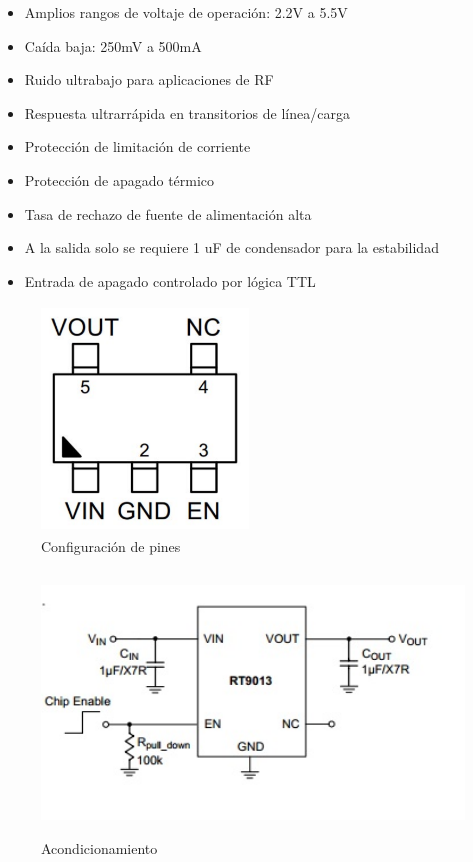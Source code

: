 \begin{itemize}
    \item Amplios rangos de voltaje de operación: 2.2V a 5.5V
    \item Caída baja: 250mV a 500mA
    \item Ruido ultrabajo para aplicaciones de RF
    \item Respuesta ultrarrápida en transitorios de línea/carga
    \item Protección de limitación de corriente
    \item Protección de apagado térmico
    \item Tasa de rechazo de fuente de alimentación alta
    \item A la salida solo se requiere 1 uF de condensador para la estabilidad
    \item Entrada de apagado controlado por lógica TTL
\end{itemize}

\vspace{1cm}

\begin{figure}[H]
    \centering
    \includegraphics[width=5.5cm, height=6cm]{imagenes/esquematico RT9013.pdf}
    \caption{Configuración de pines}
    \label{imag:pines_RT9013}
\end{figure}

\begin{figure}[H]
    \centering
    \includegraphics[width=12cm, height=7cm]{imagenes/acondicionamiento RT9013.jpg}
    \caption{Acondicionamiento}
    \label{imag:acondicionamiento_RT9013}
\end{figure}

